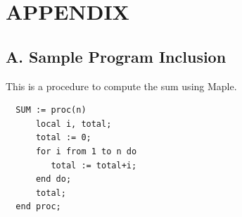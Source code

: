 \newpage
\section*{APPENDIX}
\thispagestyle{main}

\subsection*{A. Sample Program Inclusion}

This is a procedure to compute the sum using Maple.
\begin{verbatim}
  SUM := proc(n)
      local i, total;
      total := 0;
      for i from 1 to n do
         total := total+i;
      end do;
      total;
  end proc;
\end{verbatim}
